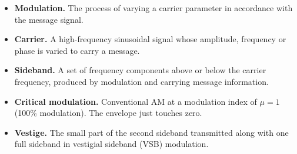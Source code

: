 \documentclass[12pt,a4paper]{article}
\begin{document}
\begin{tcolorbox}[defbox, title={One-Line Definitions}, title after break={One-Line Definitions (contd.)}]
\begin{itemize}[leftmargin=*, itemsep=3pt, topsep=0pt]
  \item \textbf{Modulation.} The process of varying a carrier parameter in accordance with the message signal.
  \item \textbf{Carrier.} A high-frequency sinusoidal signal whose amplitude, frequency or phase is varied to carry a message.
  \item \textbf{Sideband.} A set of frequency components above or below the carrier frequency, produced by modulation and carrying message information.
  \item \textbf{Critical modulation.} Conventional AM at a modulation index of $\mu=1$ (100\% modulation). The envelope just touches zero.
  \item \textbf{Vestige.} The small part of the second sideband transmitted along with one full sideband in vestigial sideband (VSB) modulation.
\end{itemize}
\end{tcolorbox}
\end{document}
